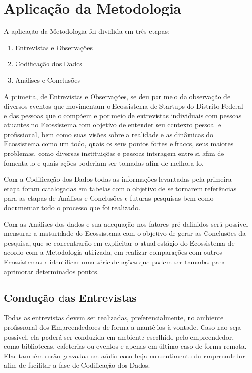 \section{Aplicação da Metodologia}
\label{subsection:aplicacao_da_metodologia}

A aplicação da Metodologia foi dividida em três etapas:

\begin{enumerate}
  \item Entrevistas e Observações
  \item Codificação dos Dados
  \item Análises e Conclusões
\end{enumerate}

A primeira, de Entrevistas e Observações, se deu por meio da observação de diversos eventos que movimentam o Ecossistema de Startups do Distrito Federal e das pessoas que o compõem e por meio de entrevistas individuais com pessoas atuantes no Ecossistema com objetivo de entender seu contexto pessoal e profissional, bem como suas visões sobre a realidade e as dinâmicas do Ecossistema como um todo, quais os seus pontos fortes e fracos, seus maiores problemas, como diversas instituições e pessoas interagem entre si afim de fomenta-lo e quais ações poderiam ser tomadas afim de melhora-lo.

Com a Codificação dos Dados todas as informações levantadas pela primeira etapa foram catalogadas em tabelas com o objetivo de se tornarem referências para as etapas de Análises e Conclusões e futuras pesquisas bem como documentar todo o processo que foi realizado. 

Com as Análises dos dados e sua adequação nos fatores pré-definidos será possível mensurar a maturidade do Ecossistema com o objetivo de gerar as Conclusões da pesquisa, que se concentrarão em explicitar o atual estágio do Ecossistema de acordo com a Metodologia utilizada, em realizar comparações com outros Ecossistemas e identificar uma série de ações que podem ser tomadas para aprimorar determinados pontos.

\subsection{Condução das Entrevistas}
\label{subsection:conducao_das_entrevistas}

Todas as entrevistas devem ser realizadas, preferencialmente, no ambiente profissional dos Empreendedores de forma a mantê-los à vontade. Caso não seja possível, ela poderá ser conduzida em ambiente escolhido pelo empreendedor, como bibliotecas, cafeterias ou eventos e apenas em último caso de forma remota. Elas também serão gravadas em aúdio caso haja consentimento do empreendedor afim de facilitar a fase de Codificação dos Dados.

